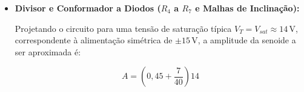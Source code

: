 \documentclass[11pt,a4paper]{article}
\begin{document}
\begin{itemize}
    \[
    f=\frac{R_2}{4R_1R_3C_1}
    \]

    Substituindo os valores:

    \[
    f=
    \frac{23\times10^3}
    {4\times5\times10^3\times33\times10^3
    \times1\times10^{-6}}
    \]

    \[
    \boxed{f\approx34{,}85\,\text{Hz}}
    \]

    Considerando o valor efetivamente adotado para $R_1$,
    de $5{,}03\,\text{k}\Omega$, a frequência estimada passa a ser:

    \[
    f_{\text{real}}=
    \frac{23\times10^3}
    {4\times5{,}03\times10^3\times33\times10^3
    \times1\times10^{-6}}
    \]

    \[
    \boxed{f_{\text{real}}\approx34{,}64\,\text{Hz}}
    \]

    Para o estágio do amplificador não inversor do conformador,
    a fim de recuperar a amplitude da onda quadrada, o ganho teórico
    necessário é:

    \[
    G=\frac{R_2}{R_1}=\frac{23}{5}=4{,}6
    \]

    Sendo a topologia não inversora dada por:

    \[
    G=1+\frac{R_f}{R_g}
    \]

    a razão necessária entre os resistores é:

    \[
    \frac{R_f}{R_g}=3{,}6
    \]

    Utilizando resistores da série E12, definiu-se:

    \[
    R_g=10\,\text{k}\Omega
    \]

    \[
    R_f=33\,\text{k}\Omega+3{,}3\,\text{k}\Omega
    =36\,\text{k}\Omega
    \]

    Dessa forma, o ganho real é:

    \[
    G_{\text{real}}=1+\frac{36}{10}=4{,}6
    \]

    Portanto, o ganho obtido corresponde exatamente ao ganho teórico
    calculado a partir dos valores nominais especificados.

    \item \textbf{Divisor e Conformador a Diodos
    ($R_4$ a $R_7$ e Malhas de Inclinação):}

    Projetando o circuito para uma tensão de saturação típica
    $V_T=V_{sat}\approx14\,\text{V}$, correspondente à alimentação
    simétrica de $\pm15\,\text{V}$, a amplitude da senoide a ser
    aproximada é:

    \[
    A=\left(0{,}45+\frac{7}{40}\right)14
    \]


\end{itemize}
\end{document}
